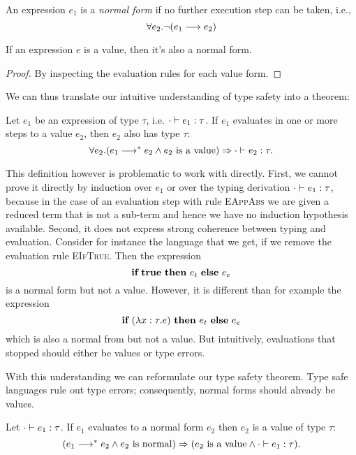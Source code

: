 {\begin{defn}
  An expression $e_1$ is a \emph{normal form} if no further execution step can be
  taken, i.e.,
  \[ \forall e_2. \neg ({e_1} \longrightarrow {e_2}) \]
\end{defn}

\begin{lem}
  If an expression $e$ is a value, then it's also a normal form.
  \begin{proof}
    By inspecting the evaluation rules for each value form.
  \end{proof}
\end{lem}

We can thus translate our intuitive understanding of type safety into a theorem:

\begin{thm}
  Let $e_1$ be an expression of type $\tau$,
  i.e. ${\cdot} \vdash {e_1} : {\tau}$. If $e_1$ evaluates in one or more steps to a
  value $e_2$, then $e_2$ also has type $\tau$:
  \[ \forall e_2. ({e_1} \longrightarrow^* {e_2} \wedge e_2~\text{is a value}) \Rightarrow
     {\cdot} \vdash {e_2} : {\tau}.
  \]
\end{thm}

This definition however is problematic to work with directly. First, we cannot
prove it directly by induction over $e_1$ or over the typing derivation
${\cdot} \vdash {e_1} : {\tau}$, because in the case of an evaluation step with rule
\textsc{EAppAbs} we are given a reduced term that is not a sub-term and hence we
have no induction hypothesis available. Second, it does not express strong
coherence between typing and evaluation. Consider for instance the language that
we get, if we remove the evaluation rule \textsc{EIfTrue}. Then the expression
\[ \textbf{if}~{\textbf{true}}~\textbf{then}~{e_t}~\textbf{else}~{e_e} \]
\noindent is a normal form but not a value. However, it is different than for
example the expression
\[ \textbf{if}~{(\lambda x:\tau.e)}~\textbf{then}~{e_t}~\textbf{else}~{e_e} \]
\noindent which is also a normal from but not a value. But intuitively,
evaluations that stopped should either be values or type errors.

With this understanding we can reformulate our type safety theorem. Type safe
languages rule out type errors; consequently, normal forms should already be
values.

\begin{thm}\label{thm:stlcbool:typesafety}
  Let ${\cdot} \vdash {e_1} : {\tau}$. If $e_1$ evaluates to a normal form $e_2$
  then $e_2$ is a value of type $\tau$:
  \[ ({e_1} \longrightarrow^* {e_2} \wedge e_2~\text{is normal}) \Rightarrow
     (e_2~\text{is a value} \wedge {\cdot} \vdash {e_1} : {\tau}).
   \]
\end{thm}

}
